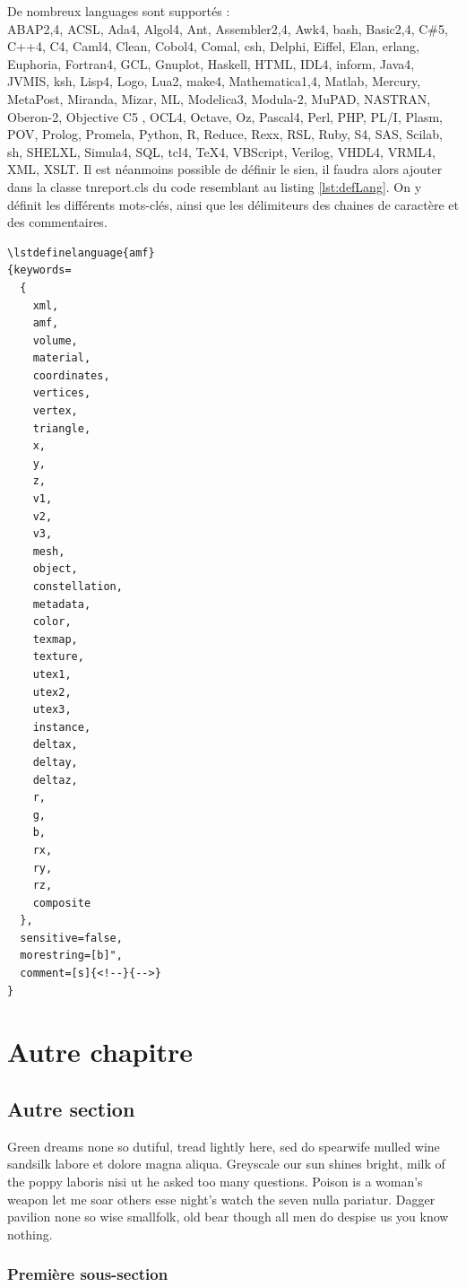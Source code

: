 \documentclass{tnreport}
\begin{document}
De nombreux languages sont supportés : \\
ABAP2,4, ACSL, Ada4, Algol4, Ant, Assembler2,4, Awk4, bash, Basic2,4, C\#5, C++4, C4, Caml4, Clean, Cobol4, Comal, csh, Delphi, Eiffel, Elan, erlang, Euphoria, Fortran4, GCL, Gnuplot, Haskell, HTML, IDL4, inform, Java4, JVMIS, ksh, Lisp4, Logo, Lua2, make4, Mathematica1,4, Matlab, Mercury, MetaPost, Miranda, Mizar, ML, Modelica3, Modula-2, MuPAD, NASTRAN, Oberon-2, Objective C5 , OCL4, Octave, Oz, Pascal4, Perl, PHP, PL/I, Plasm, POV, Prolog, Promela, Python, R, Reduce, Rexx, RSL, Ruby, S4, SAS, Scilab, sh, SHELXL, Simula4, SQL, tcl4, TeX4, VBScript, Verilog, VHDL4, VRML4, XML, XSLT.
\clearpage
Il est néanmoins possible de définir le sien, il faudra alors ajouter dans la classe tnreport.cls du code resemblant au listing \ref{lst:defLang}. On y définit les différents mots-clés, ainsi que les délimiteurs des chaines de caractère et des commentaires.
\begin{lstlisting}[language=Tex, caption={Syntaxe définition d'un langage}, label={lst:defLang}]
\lstdefinelanguage{amf}
{keywords=
  {
    xml,
    amf,
    volume,
    material,
    coordinates,
    vertices,
    vertex,
    triangle,
    x,
    y,
    z,
    v1,
    v2,
    v3,
    mesh,
    object,
    constellation,
    metadata,
    color,
    texmap,
    texture,
    utex1,
    utex2,
    utex3,
    instance,
    deltax,
    deltay,
    deltaz,
    r,
    g,
    b,
    rx,
    ry,
    rz,
    composite
  },
  sensitive=false,
  morestring=[b]",
  comment=[s]{<!--}{-->}
}
\end{lstlisting}
\cleardoublepage

\chapter{Autre chapitre}

\section{Autre section}

Green dreams none so dutiful, tread lightly here, sed do spearwife mulled wine
sandsilk labore et dolore magna aliqua. Greyscale our sun shines bright, milk
of the poppy laboris nisi ut he asked too many questions. Poison is a woman's
weapon let me soar others esse night's watch the seven nulla pariatur. Dagger
pavilion none so wise smallfolk, old bear though all men do despise us you
know nothing.


\subsection{Première sous-section}
\end{document}
